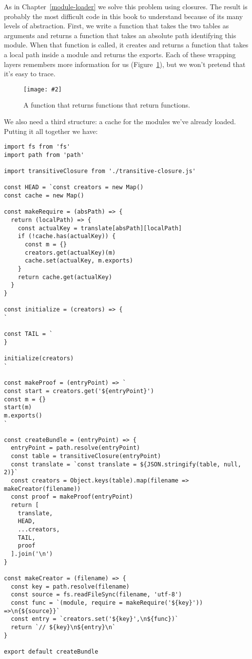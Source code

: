 \documentclass[krantzl]{krantz}
\newcommand{\figpdf}[4]{\begin{figure}%
\centering%
\texttt{[image: \#2]}%
\caption{#3}%
\label{#1}%
\end{figure}}
\newcommand{\chapref}[1]{Chapter~\ref{#1}}
\newcommand{\figref}[1]{Figure~\ref{#1}}
\begin{document}
As in \chapref{module-loader} we solve this problem using closures.
The result is probably the most difficult code in this book to understand
because of its many levels of abstraction.
First, we write a function that takes the two tables as arguments
and returns a function that takes an absolute path identifying this module.
When that function is called,
it creates and returns a function that takes a local path inside a module and returns the exports.
Each of these wrapping layers remembers more information for us
(\figref{module-bundler-returning-functions}),
but we won’t pretend that it’s easy to trace.

\figpdf{module-bundler-returning-functions}{./module-bundler/returning-functions.pdf}{A function that returns functions that return functions.}{0.6}


We also need a third structure:
a cache for the modules we’ve already loaded.
Putting it all together we have:


\begin{lstlisting}[frame=tblr]
import fs from 'fs'
import path from 'path'

import transitiveClosure from './transitive-closure.js'

const HEAD = `const creators = new Map()
const cache = new Map()

const makeRequire = (absPath) => {
  return (localPath) => {
    const actualKey = translate[absPath][localPath]
    if (!cache.has(actualKey)) {
      const m = {}
      creators.get(actualKey)(m)
      cache.set(actualKey, m.exports)
    }
    return cache.get(actualKey)
  }
}

const initialize = (creators) => {
`

const TAIL = `
}

initialize(creators)
`

const makeProof = (entryPoint) => `
const start = creators.get('${entryPoint}')
const m = {}
start(m)
m.exports()
`

const createBundle = (entryPoint) => {
  entryPoint = path.resolve(entryPoint)
  const table = transitiveClosure(entryPoint)
  const translate = `const translate = ${JSON.stringify(table, null, 2)}`
  const creators = Object.keys(table).map(filename => makeCreator(filename))
  const proof = makeProof(entryPoint)
  return [
    translate,
    HEAD,
    ...creators,
    TAIL,
    proof
  ].join('\n')
}

const makeCreator = (filename) => {
  const key = path.resolve(filename)
  const source = fs.readFileSync(filename, 'utf-8')
  const func = `(module, require = makeRequire('${key}')) =>\n{${source}}`
  const entry = `creators.set('${key}',\n${func})`
  return `// ${key}\n${entry}\n`
}

export default createBundle
\end{lstlisting}
\end{document}
